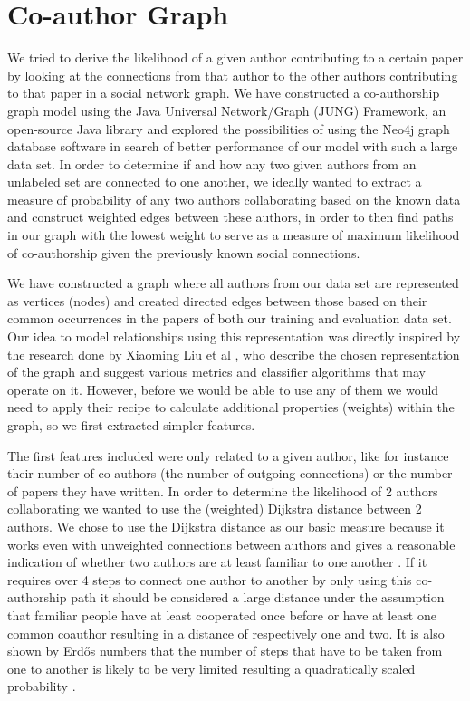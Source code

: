 \section*{Co-author Graph}

We tried to derive the likelihood of a given author contributing to a certain paper by looking at the connections from that author to the other authors contributing to that paper in a social network graph. We have constructed a co-authorship graph model using the Java Universal Network/Graph (JUNG) Framework, an open-source Java library \cite{o2005analysis} and explored the possibilities of using the Neo4j graph database software \cite{rodrigez2010mysql} in search of better performance of our model with such a large data set.
In order to determine if and how any two given authors from an unlabeled set are connected to one another, we ideally wanted to extract a measure of probability of any two authors collaborating based on the known data and construct weighted edges between these authors, in order to then find paths in our graph with the lowest weight to serve as a measure of maximum likelihood of co-authorship given the previously known social connections.

We have constructed a graph where all authors from our data set are represented as vertices (nodes) and created directed edges between those based on their common occurrences in the papers of both our training and evaluation data set. Our idea to model relationships using this representation was directly inspired by the research done by Xiaoming Liu et al \cite{liu2005co}, who describe the chosen representation of the graph and suggest various metrics and classifier algorithms that may operate on it\cite{liu2005co}.
However, before we would be able to use any of them we would need to apply their recipe to calculate additional properties (weights) within the graph, so we first extracted simpler features.

The first features included were only related to a given author, like for instance their number of co-authors (the number of outgoing connections) or the number of papers they have written. In order to determine the likelihood of 2 authors collaborating we wanted to use the (weighted) Dijkstra distance between 2 authors. We chose to use the Dijkstra distance as our basic measure because it works even with unweighted connections between authors and gives a reasonable indication of whether two authors are at least familiar to one another \cite{o2005analysis}.  If it requires over 4 steps to connect one author to another by only using this co-authorship path it should be considered a large distance under the assumption that familiar people have at least cooperated once before or have at least one common coauthor resulting in a distance of respectively one and two. It is also shown by Erdős numbers that the number of steps that have to be taken from one to another is likely to be very limited resulting a quadratically scaled probability \cite{balaban2002co}.

